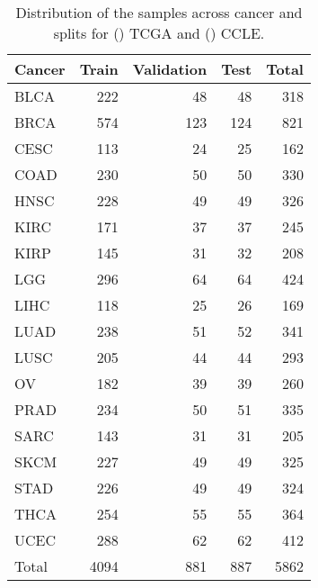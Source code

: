  \begin{table}[htbp]
     \centering
     \caption{Distribution of the samples across cancer and splits for () TCGA and () CCLE.}
     \begin{subtable}[t]{0.45\textwidth}
         \subcaption{}
         \begin{tabular}{lrrrr}
             \toprule
             Cancer & Train & Validation & Test & Total \\
             \midrule
             BLCA   & 222   & 48         & 48   & 318   \\
             BRCA   & 574   & 123        & 124  & 821   \\
             CESC   & 113   & 24         & 25   & 162   \\
             COAD   & 230   & 50         & 50   & 330   \\
             HNSC   & 228   & 49         & 49   & 326   \\
             KIRC   & 171   & 37         & 37   & 245   \\
             KIRP   & 145   & 31         & 32   & 208   \\
             LGG    & 296   & 64         & 64   & 424   \\
             LIHC   & 118   & 25         & 26   & 169   \\
             LUAD   & 238   & 51         & 52   & 341   \\
             LUSC   & 205   & 44         & 44   & 293   \\
             OV     & 182   & 39         & 39   & 260   \\
             PRAD   & 234   & 50         & 51   & 335   \\
             SARC   & 143   & 31         & 31   & 205   \\
             SKCM   & 227   & 49         & 49   & 325   \\
             STAD   & 226   & 49         & 49   & 324   \\
             THCA   & 254   & 55         & 55   & 364   \\
             UCEC   & 288   & 62         & 62   & 412   \\
             \midrule
             Total  & 4094  & 881        & 887  & 5862  \\
             \bottomrule
         \end{tabular}\label{tab:tcga}
     \end{subtable}
     \begin{subtable}[t]{0.45\textwidth}

\end{subtable}
\end{table}
